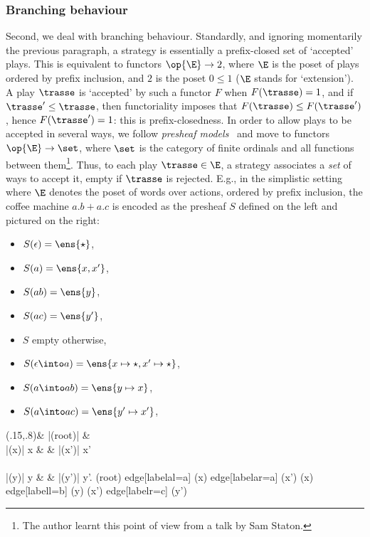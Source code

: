 \documentclass{LMCS}
\theoremstyle{plain}\newtheorem{satz}[thm]{Satz}
\renewcommand{\plays}{\E}
\renewcommand{\Plays}{\E}
\begin{document}
\subsubsection*{Branching behaviour}
Second, we deal with 
branching behaviour. Standardly, and ignoring momentarily the previous
paragraph, a strategy is essentially a prefix-closed set of `accepted'
plays.  This is equivalent to functors $\op{\plays} \to 2$, where
$\plays$ is the poset of plays ordered by prefix inclusion, and $2$ is
the poset $0 \leq 1$ ($\plays$ stands for `extension').  A play
$\trasse$ is `accepted' by such a functor $F$ when $F(\trasse) = 1$,
and if $\trasse' \leq \trasse$, then functoriality imposes that
$F(\trasse) \leq F(\trasse')$, hence $F(\trasse') = 1$: this is
prefix-closedness.  In order to allow plays to be accepted in several
ways, we follow \emph{presheaf models}~\cite{DBLP:conf/lics/JoyalNW93}
and move to functors $\op{\plays} \to \set$, where $\set$ is the
category of finite ordinals and all functions between
them\footnote{The author learnt this point of view from a talk by Sam
  Staton.}. Thus, to each play $\trasse \in \plays$, a strategy
associates a \emph{set} of ways to accept it, empty if $\trasse$ is
rejected.  E.g., in the simplistic setting where $\Plays$ denotes the
poset of words over actions, ordered by prefix inclusion, the coffee
machine $a.b + a.c$ is encoded as the presheaf $S$ defined on the left
and pictured on the right:
\begin{center}
    \begin{minipage}[c]{0.26\linewidth}
      \begin{itemize}
      \item $S (\epsilon) = \ens{\star}$,
      \item $S (a) = \ens{x,x'}$,
      \item $S (ab) = \ens{y}$,
      \item $S (ac) = \ens{y'}$,
      \end{itemize}
    \end{minipage}
      \hfil
    \begin{minipage}[c]{0.44\linewidth}
      \begin{itemize}
      \item $S$ empty otherwise,
      \item $S (\epsilon \into a) = \ens{x \mapsto \star, x' \mapsto \star}$,
      \item $S (a \into ab) = \ens{y \mapsto x}$,
      \item $S (a \into ac) = \ens{y' \mapsto x'}$,
      \end{itemize}
    \end{minipage}
      \hfil
      \begin{minipage}[c]{0.28\linewidth}
        \vspace*{-.8em}
        \diag(.15,.8){\& |(root)| \star \& \\
          |(x)| x \& \& |(x')| x' \\
          \\
          |(y)| y \& \& |(y')| y'. }{(root) edge[labelal={a}] (x) edge[labelar={a}] (x') (x) edge[labell={b}] (y) (x') edge[labelr={c}] (y') }
      \end{minipage}
\end{center}
\end{document}
